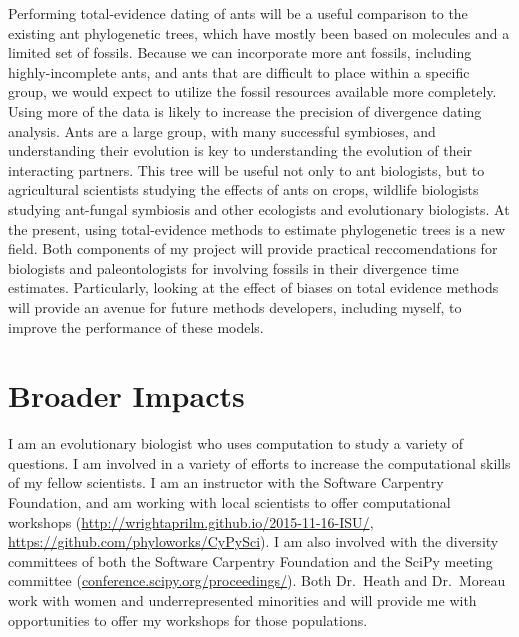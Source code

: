 \documentclass[]{article}
\begin{document}
Performing total-evidence dating of ants will be a useful comparison to the existing ant phylogenetic trees, which have mostly been based on molecules and a limited set of fossils. Because we can incorporate more ant fossils, including highly-incomplete ants, and ants that are difficult to place within a specific group, we would expect to utilize the fossil resources available more completely. Using more of the data is likely to increase the precision of divergence dating analysis. Ants are a large group, with many successful symbioses, and understanding their evolution is key to understanding the evolution of their interacting partners. This tree will be useful not only to ant biologists, but to agricultural scientists studying the effects of ants on crops, wildlife biologists studying ant-fungal symbiosis and other ecologists and evolutionary biologists.
At the present, using total-evidence methods to estimate phylogenetic trees is a new field. Both components of my project will provide practical reccomendations for biologists and paleontologists for involving fossils in their divergence time estimates.
Particularly, looking at the effect of biases on total evidence methods will provide an avenue for future methods developers, including myself, to improve the performance of these models.
\section{Broader Impacts}

I am an evolutionary biologist who uses computation to study a variety of questions. I am involved in a variety of efforts to increase the computational skills of my fellow scientists. I am an instructor with the Software Carpentry Foundation, and am working with local scientists to offer computational workshops (\url{http://wrightaprilm.github.io/2015-11-16-ISU/}, \url{https://github.com/phyloworks/CyPySci}). I am also involved with the diversity committees of both the Software Carpentry Foundation and the SciPy meeting committee (\url{conference.scipy.org/proceedings/}). Both Dr.\ Heath and Dr.\ Moreau work with women and underrepresented minorities and will provide me with opportunities to offer my workshops for those populations. 
\end{document}
